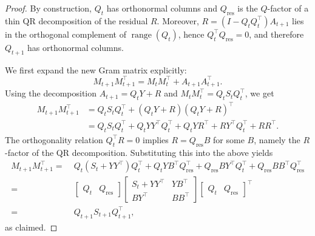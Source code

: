 \documentclass[10pt,a4paper]{amsart}
\begin{document}
\begin{proof}
By construction, $Q_t$ has orthonormal columns and $Q_{\mathrm{res}}$ is the
$Q$-factor of a thin QR decomposition of the residual $R$. Moreover,
$R=(I-Q_t Q_t^\top)A_{t+1}$ lies in the orthogonal complement of
$\operatorname{range}(Q_t)$, hence
$Q_t^\top Q_{\mathrm{res}} = 0$, and therefore $Q_{t+1}$ has orthonormal
columns.

We first expand the new Gram matrix explicitly:
\[
  M_{t+1} M_{t+1}^\top
  = M_t M_t^\top + A_{t+1} A_{t+1}^\top.
\]
Using the decomposition $A_{t+1} = Q_t Y + R$ and $M_t M_t^\top = Q_t S_t Q_t^\top$,
we get
\[
  \begin{aligned}
  M_{t+1} M_{t+1}^\top
  &= Q_t S_t Q_t^\top
     + (Q_t Y + R)(Q_t Y + R)^\top \\
  &= Q_t S_t Q_t^\top
     + Q_t Y Y^\top Q_t^\top
     + Q_t Y R^\top
     + R Y^\top Q_t^\top
     + R R^\top.
  \end{aligned}
\]
The orthogonality relation $Q_t^\top R = 0$ implies $R = Q_{\mathrm{res}} B$
for some $B$, namely the $R$-factor of the QR decomposition. Substituting this
into the above yields
\[
  \begin{aligned}
  M_{t+1} M_{t+1}^\top
  =&\;
  Q_t (S_t + Y Y^\top) Q_t^\top
  + Q_t Y B^\top Q_{\mathrm{res}}^\top
  + Q_{\mathrm{res}} B Y^\top Q_t^\top
  + Q_{\mathrm{res}} B B^\top Q_{\mathrm{res}}^\top \\[0.3em]
  =&\;
  \begin{bmatrix}Q_t & Q_{\mathrm{res}}\end{bmatrix}
  \begin{bmatrix}
    S_t + Y Y^\top & Y B^\top\\
    B Y^\top       & B B^\top
  \end{bmatrix}
  \begin{bmatrix}Q_t & Q_{\mathrm{res}}\end{bmatrix}^\top \\
  =&\; Q_{t+1} S_{t+1} Q_{t+1}^\top,
  \end{aligned}
\]
as claimed.
\end{proof}
\end{document}
